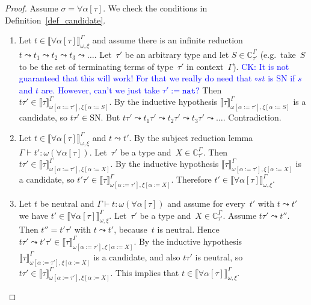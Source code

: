 \documentclass[runningheads,a4paper]{llncs}
\newcommand{\subst}[2]{#1:=#2}
\newcommand{\nat}{\mathtt{nat}}
\newcommand{\SN}{\mathrm{SN}}
\newcommand{\Cb}{\mathbb{C}}
\newcommand{\val}[3]{\ensuremath{\llbracket#1\rrbracket_{#2}^{#3}}}
\newcommand{\proves}{\vdash}
\newcommand{\CK}[1]{\textcolor{blue}{CK: #1}}
\begin{document}
\begin{proof}
  Assume $\sigma = \forall\alpha[\tau]$. We check the conditions in
  Definition~\ref{def_candidate}.
  \begin{enumerate}
  \item Let $t \in \val{\forall\alpha[\tau]}{\omega,\xi}{\Gamma}$ and
    assume there is an infinite reduction
    $t \leadsto t_1 \leadsto t_2 \leadsto t_3 \leadsto
    \ldots$. Let~$\tau'$ be an arbitrary type and let
    $S \in \Cb_{\tau'}^\Gamma$ (e.g.~take~$S$ to be the set of
    terminating terms of type~$\tau'$ in context~$\Gamma$).
    \CK{It is not guaranteed that this will work! For that we really
    do need that $\circ s t$ is SN if $s$ and $t$ are.  However, can't
    we just take $\tau' := \nat$?}
    Then
    $t \tau' \in
    \val{\tau}{\omega[\subst{\alpha}{\tau'}],\xi[\subst{\alpha}{S}]}{\Gamma}$. By
    the inductive hypothesis
    $\val{\tau}{\omega[\subst{\alpha}{\tau'}],\xi[\subst{\alpha}{S}]}{\Gamma}$
    is a candidate, so $t \tau' \in \SN$. But
    $t \tau' \leadsto t_1 \tau' \leadsto t_2 \tau' \leadsto t_3 \tau'
    \leadsto \ldots$. Contradiction.
  \item Let $t \in \val{\forall\alpha[\tau]}{\omega,\xi}{\Gamma}$ and
    $t \leadsto t'$. By the subject reduction lemma
    $\Gamma \proves t' : \omega(\forall\alpha[\tau])$. Let~$\tau'$ be
    a type and~$X \in \Cb_{\tau'}^\Gamma$. Then
    $t \tau' \in
    \val{\tau}{\omega[\subst{\alpha}{\tau'}],\xi[\subst{\alpha}{X}]}{\Gamma}$. By
    the inductive hypothesis
    $\val{\tau}{\omega[\subst{\alpha}{\tau'}],\xi[\subst{\alpha}{X}]}{\Gamma}$
    is a candidate, so
    $t' \tau' \in
    \val{\tau}{\omega[\subst{\alpha}{\tau'}],\xi[\subst{\alpha}{X}]}{\Gamma}$. Therefore
    $t' \in \val{\forall\alpha[\tau]}{\omega,\xi}{\Gamma}$.
  \item Let $t$ be neutral and
    $\Gamma \proves t : \omega(\forall\alpha[\tau])$ and assume for
    every~$t'$ with $t \leadsto t'$ we have
    $t' \in
    \val{\forall\alpha[\tau]}{\omega,\xi}{\Gamma}$. Let~$\tau'$ be a
    type and~$X \in \Cb_{\tau'}^\Gamma$. Assume
    $t \tau' \leadsto t''$. Then $t'' = t' \tau'$ with
    $t \leadsto t'$, because~$t$ is neutral. Hence
    $t \tau' \leadsto t' \tau' \in
    \val{\tau}{\omega[\subst{\alpha}{\tau'}],\xi[\subst{\alpha}{X}]}{\Gamma}$. By
    the inductive
    hypothesis~$\val{\tau}{\omega[\subst{\alpha}{\tau'}],\xi[\subst{\alpha}{X}]}{\Gamma}$
    is a candidate, and also $t \tau'$ is neutral, so
    $t \tau' \in
    \val{\tau}{\omega[\subst{\alpha}{\tau'}],\xi[\subst{\alpha}{X}]}{\Gamma}$. This
    implies that
    $t \in \val{\forall\alpha[\tau]}{\omega,\xi}{\Gamma}$.

\end{enumerate}
\end{proof}
\end{document}
